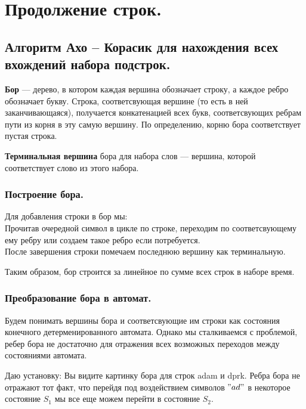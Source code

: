 \section{Продолжение строк.}
\subsection{Алгоритм Ахо -- Корасик для нахождения всех вхождений набора подстрок.}%

\begin{Def}
	\textbf{Бор} --- дерево, в котором каждая вершина обозначает строку, а каждое ребро обозначает букву. Строка, соответсвующая вершине (то есть в ней заканчивающаяся), получается конкатенацией всех букв, соответсвующих ребрам пути из корня в эту самую вершину. По определению, корню бора соответствует пустая строка.
\end{Def}

\begin{Def}
	\textbf{Терминальная вершина} бора для набора слов --- вершина, которой соответствует слово из этого набора.
\end{Def}

\subsubsection{Построение бора.}%
\label{ssub:Построение бора.}

Для добавления строки в бор мы: \\
Прочитав очередной символ в цикле по строке, переходим по соответсвующему ему ребру или создаем такое ребро если потребуется. \\
После завершения строки помечаем последнюю вершину как терминальную.

Таким образом, бор строится за линейное по сумме всех строк в наборе время.

\subsubsection{Преобразование бора в автомат.}%
Будем понимать вершины бора и соответсвующие им строки как состояния конечного детерменированного автомата. Однако мы сталкиваемся с проблемой, ребер бора не достаточно для отражения всех возможных переходов между состояниями автомата. 
\begin{example}
	Даю установку: Вы видите картинку бора для строк adam и dprk.
	Ребра бора не отражают тот факт, что перейдя под воздействием символов $"ad"$ в некоторое состояние  $S_1$ мы все еще можем перейти в состояние  $S_2$.
\end{example}

